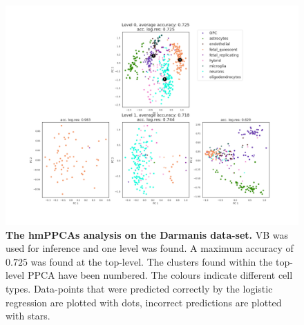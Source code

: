 \begin{figure}
    \centering
    \includegraphics[width=\linewidth]{figs/Darmanis_tree_VB.png}
    \caption[The hmPPCAs analysis on the Darmanis data-set.]{\small \textbf{The hmPPCAs analysis on the Darmanis data-set.} \small VB was used for inference and one level was found. A maximum accuracy of $0.725$ was found at the top-level. The clusters found within the top-level PPCA have been numbered. The colours indicate different cell types. Data-points that were predicted correctly by the logistic regression are plotted with dots, incorrect predictions are plotted with stars.}
    \label{fig:darmanis_vb}
\end{figure}




